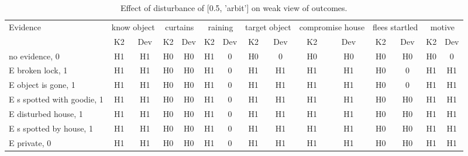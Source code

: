 \begin{table}\begin{tabular}{l|cc|cc|cc|cc|cc|cc|cc}\toprule\multirow{2}{*}{Evidence} & \multicolumn{2}{c}{know object}& \multicolumn{2}{c}{curtains}& \multicolumn{2}{c}{raining}& \multicolumn{2}{c}{target object}& \multicolumn{2}{c}{compromise house}& \multicolumn{2}{c}{flees startled}& \multicolumn{2}{c}{motive}\\& {K2} & {Dev}& {K2} & {Dev}& {K2} & {Dev}& {K2} & {Dev}& {K2} & {Dev}& {K2} & {Dev}& {K2} & {Dev}\\\midrule
no evidence, 0 & H1&H1&H0&H0&\cellcolor{Bittersweet}H1&\cellcolor{Bittersweet}0&\cellcolor{Bittersweet}H0&\cellcolor{Bittersweet}0&H0&H0&H0&H0&\cellcolor{Bittersweet}H0&\cellcolor{Bittersweet}0\\E broken lock, 1 & H1&H1&H0&H0&\cellcolor{Bittersweet}H1&\cellcolor{Bittersweet}0&H1&H1&H1&H1&\cellcolor{Bittersweet}H0&\cellcolor{Bittersweet}0&H1&H1\\E object is gone, 1 & H1&H1&H0&H0&\cellcolor{Bittersweet}H1&\cellcolor{Bittersweet}0&H1&H1&H1&H1&\cellcolor{Bittersweet}H0&\cellcolor{Bittersweet}0&H1&H1\\E s spotted with goodie, 1 & H1&H1&H0&H0&\cellcolor{Bittersweet}H1&\cellcolor{Bittersweet}0&H1&H1&H1&H1&H0&H0&H1&H1\\E disturbed house, 1 & H1&H1&H0&H0&\cellcolor{Bittersweet}H1&\cellcolor{Bittersweet}0&H1&H1&H1&H1&H0&H0&H1&H1\\E s spotted by house, 1 & H1&H1&H0&H0&\cellcolor{Bittersweet}H1&\cellcolor{Bittersweet}0&H1&H1&H1&H1&H0&H0&H1&H1\\E private, 0 & H1&H1&H0&H0&\cellcolor{Bittersweet}H1&\cellcolor{Bittersweet}0&H1&H1&H1&H1&H0&H0&H1&H1\\\bottomrule\end{tabular}\caption{Effect of disturbance of [0.5, 'arbit'] on weak view of outcomes.}\end{table}